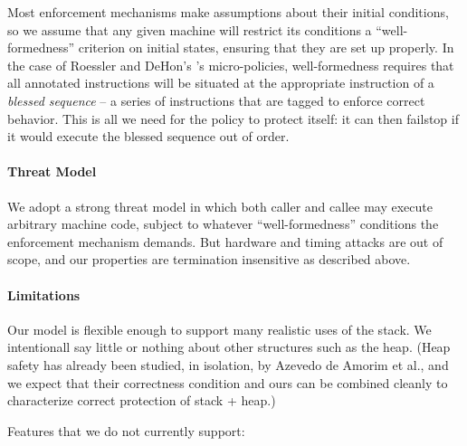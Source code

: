 \documentclass[10pt,conference]{ieeetran}%
\theoremstyle{definition}
\begin{document}
Most enforcement mechanisms make assumptions about their initial conditions,
so we assume that any given machine will restrict its conditions a ``well-formedness''
criterion on initial states, ensuring that they are set up properly. In the case of
Roessler and DeHon's \cite{DBLP:conf/sp/RoesslerD18}'s micro-policies, well-formedness
requires that all annotated instructions will be situated at the appropriate instruction
of a {\em blessed sequence} -- a series of instructions that are tagged to enforce correct
behavior. This is all we need for the policy to protect itself: it can then failstop if it would
execute the blessed sequence out of order.

\paragraph*{Threat Model}

We adopt a strong threat model in which both caller and callee may execute
arbitrary machine code, subject to whatever ``well-formedness'' conditions the
enforcement mechanism demands. But hardware and timing attacks are out of scope,
and our properties are termination insensitive as described above.

\paragraph*{Limitations}

Our model is flexible enough to support many realistic uses of the stack.
We intentionall say little or nothing about other structures
such as the heap.  (Heap safety has already been studied, in isolation,
by Azevedo de Amorim et al., and we expect that their correctness condition and ours can be
combined cleanly to characterize correct protection of stack + heap.)

Features that we do not currently support:
\end{document}
